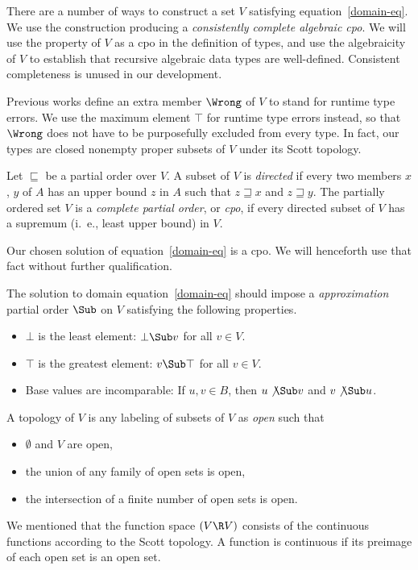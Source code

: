 \documentclass{amsart}
\begin{document}
There are a number of ways to construct a set $V$ satisfying
equation~\eqref{domain-eq}. We use the construction producing a
\emph{consistently complete algebraic cpo}. We will use the
property of $V$ as a cpo in the definition of types, and use the
algebraicity of $V$ to establish that recursive algebraic data
types are well-defined. Consistent completeness is unused in our
development.

Previous works define an extra member $\Wrong$ of $V$ to stand
for runtime type errors. We use the maximum element $\top$ for
runtime type errors instead, so that $\Wrong$ does not have to be
purposefully excluded from every type. In fact, our types are
closed nonempty proper subsets of $V$ under its Scott topology.


Let $\sqsubseteq$ be a partial order over $V$. A subset of $V$ is
\emph{directed} if every two members $x$, $y$ of $A$ has an upper
bound $z$ in $A$ such that $z\sqsupseteq x$ and $z\sqsupseteq y$.
The partially ordered set $V$ is a \emph{complete partial order},
or \emph{cpo}, if every directed subset of $V$ has a supremum
(i.~e., least upper bound) in $V$.

Our chosen solution of equation~\eqref{domain-eq} is a cpo. We
will henceforth use that fact without further qualification.


The solution to domain equation~\eqref{domain-eq} should impose a
\emph{approximation} partial order $\Sub$ on $V$ satisfying the
following properties.
\begin{itemize}
\item $\bot$ is the least element: $\bot\Sub v$ for all $v\in V$.
\item $\top$ is the greatest element: $v\Sub\top$ for all $v\in
V$.
\item Base values are incomparable: If $u,v\in B$, then
$u\not\Sub v$ and $v\not\Sub u$.
\end{itemize}
A topology of $V$ is any labeling of subsets of $V$ as
\emph{open} such that
\begin{itemize}
\item $\emptyset$ and $V$ are open,
\item the union of any family of open sets is open,
\item the intersection of a finite number of open sets is open.
\end{itemize}
We mentioned that the function space $(V\R V)$ consists of the
continuous functions according to the Scott topology. A function
is continuous if its preimage of each open set is an open set.
\end{document}
